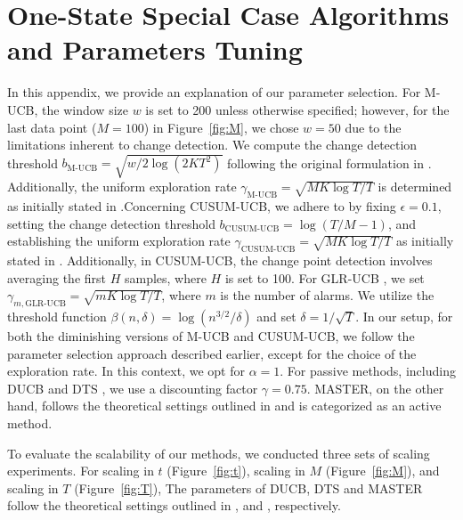 \documentclass[twoside]{article}
\theoremstyle{plain}
\theoremstyle{definition}
\theoremstyle{remark}
\begin{document}
\section{One-State Special Case Algorithms and Parameters Tuning}
\label{app:para_one_state}
In this appendix, we provide an explanation of our parameter selection. For M-UCB, the window size $w$ is set to 200 unless otherwise specified; however, for the last data point ($M=100$) in Figure~\ref{fig:M}, we chose $w=50$ due to the limitations inherent to change detection. We compute the change detection threshold $b_{\textrm{M-UCB}} = \sqrt{w/2 \log\left(2KT^{2}\right)}$ following the original formulation in \cite{cao2019nearly}. Additionally, the uniform exploration rate $\gamma_{\textrm{M-UCB}} = \sqrt{MK \log{T}/T}$ is determined as initially stated in \cite{besson2022efficient}.Concerning CUSUM-UCB, we adhere to \cite{liu2018change} by fixing $\epsilon = 0.1$, setting the change detection threshold $b_{\textrm{CUSUM-UCB}} = \log\left(T/M-1\right)$, and establishing the uniform exploration rate $\gamma_{\textrm{CUSUM-UCB}} = \sqrt{MK \log{T}/T}$ as initially stated in \cite{besson2022efficient}. Additionally, in CUSUM-UCB, the change point detection involves averaging the first $H$ samples, where $H$ is set to 100. For GLR-UCB \citep{besson2022efficient}, we set $\gamma_{m, \textrm{GLR-UCB}} = \sqrt{mK \log{T}/T}$, where $m$ is the number of alarms. We utilize the threshold function $\beta(n, \delta) = \log{\left(n^{3/2}/\delta\right)}$ and set $\delta = 1/\sqrt{T}$. In our setup, for both the diminishing versions of M-UCB and CUSUM-UCB, we follow the parameter selection approach described earlier, except for the choice of the exploration rate. In this context, we opt for $\alpha=1$. %
For passive methods, including DUCB \citep{garivier2011upper} and DTS \citep{qi2023discounted}, we use a discounting factor $\gamma = 0.75$. MASTER, on the other hand, follows the theoretical settings outlined in \cite{pmlr-v134-wei21b} and is categorized as an active method.

To evaluate the scalability of our methods, we conducted three sets of scaling experiments. For scaling in $t$ (Figure~\ref{fig:t}), scaling in $M$ (Figure~\ref{fig:M}), and scaling in $T$ (Figure~\ref{fig:T}), The parameters of DUCB, DTS and MASTER follow the theoretical settings outlined in \cite{garivier2011upper}, \cite{qi2023discounted} and \cite{pmlr-v134-wei21b}, respectively.
\end{document}
